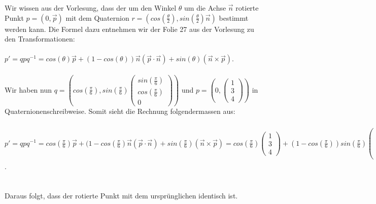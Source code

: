 \documentclass{article} %
\begin{document}
Wir wissen aus der Vorlesung, dass der um den Winkel $\theta$ um die Achse $\vec{n}$ rotierte Punkt $p = (0, \vec{p})$ mit dem Quaternion $r = (cos(\frac{\theta}{2}), sin(\frac{\theta}{2})\vec{n})$ bestimmt werden kann. Die Formel dazu entnehmen wir der Folie 27 aus der Vorlesung zu den Transformationen: \\\\$p' = qpq^{-1} = cos(\theta)\vec{p} + (1 - cos(\theta))\vec{n}(\vec{p} \cdot \vec{n}) + sin(\theta) (\vec{n} \times \vec{p})$. \\\\
Wir haben nun $q = (cos(\frac{\pi}{6}), sin(\frac{\pi}{6})\begin{pmatrix}
sin(\frac{\pi}{6})\\
cos(\frac{\pi}{6})\\
0
\end{pmatrix})$ und $p = (0, \begin{pmatrix}
1\\
3\\
4
\end{pmatrix})$ in Quaternionenschreibweise. Somit sieht die Rechnung folgendermassen aus: \\\\
$p' = qpq^{-1} = cos(\frac{\pi}{6})\vec{p} + (1 - cos(\frac{\pi}{6})\vec{n}(\vec{p} \cdot \vec{n}) + sin(\frac{\pi}{6}) (\vec{n} \times \vec{p}) = cos(\frac{\pi}{6}) \begin{pmatrix}
1\\
3\\
4
\end{pmatrix} + (1 - cos(\frac{\pi}{6})) sin(\frac{\pi}{6}) \begin{pmatrix}
sin(\frac{\pi}{6})\\
cos(\frac{\pi}{6})\\
0
\end{pmatrix} \cdot \begin{pmatrix}
sin^2(\frac{\pi}{6})\\
3sin(\frac{\pi}{6})cos(\frac{\pi}{6})\\
0
\end{pmatrix} + sin(\frac{\pi}{6}) \begin{pmatrix}
4sin(\frac{\pi}{6})cos(\frac{\pi}{6})\\
-4sin^2(\frac{\pi}{6})\\
3 sin(\frac{\pi}{6}) - cos(\frac{\pi}{6})
\end{pmatrix} = \dotso = \begin{pmatrix}
1\\
3\\
4
\end{pmatrix}$. \\\\\\
Daraus folgt, dass der rotierte Punkt mit dem ursprünglichen identisch ist.
\end{document}
